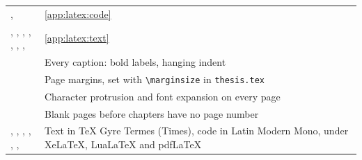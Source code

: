 \begin{xltabular}{\linewidth}{>{\ttfamily\raggedright\arraybackslash{}\hsize}X >{\raggedright\arraybackslash{}\hsize}X}
  ,  & \cref{app:latex:code} \\
  , , , , , , ,  & \cref{app:latex:text} \\
   & Every caption: bold labels, hanging indent \\
   & Page margins, set with \texttt{\textbackslash marginsize} in \texttt{thesis.tex} \\
   & Character protrusion and font expansion on every page \\
   & Blank pages before chapters have no page number \\
  , , , , , ,  & Text in TeX Gyre Termes (Times), code in Latin Modern Mono, under XeLaTeX, LuaLaTeX and pdfLaTeX \\
  \bottomrule
\end{xltabular}
